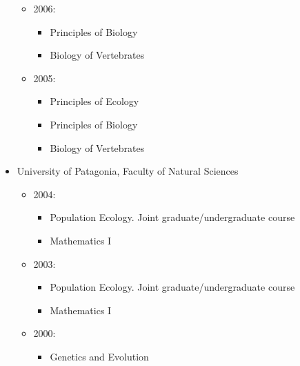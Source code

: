\documentclass{res}
\begin{document}
\begin{resume}
\begin{itemize}
	\begin{itemize}
    	\item[] 2006:
	    \begin{itemize}
		    \item[] Principles of Biology
     		\item[] Biology of Vertebrates
	    \end{itemize}
    \end{itemize} 

	\begin{itemize}
    	\item[] 2005:
    	\begin{itemize}
	    	\item[] Principles of Ecology
		    \item[] Principles of Biology
	    	\item[] Biology of Vertebrates
    	\end{itemize}
    \end{itemize} 
    \item[] University of Patagonia, Faculty of Natural Sciences
	\begin{itemize}
    	\item[] 2004:
	    \begin{itemize}
	    	\item[] Population Ecology. Joint graduate/undergraduate course
		    \item[] Mathematics I
	    \end{itemize}
    \end{itemize}    
    
   	\begin{itemize}
    	\item[] 2003:
    	\begin{itemize}
    		\item[] Population Ecology. Joint graduate/undergraduate course
    		\item[] Mathematics I
    	\end{itemize}
    \end{itemize}    
    
   	\begin{itemize}
    	\item[] 2000:
	    \begin{itemize}
    		\item[] Genetics and Evolution
	    \end{itemize}
    \end{itemize}      
\end{itemize}
 

\end{resume}
\end{document}
